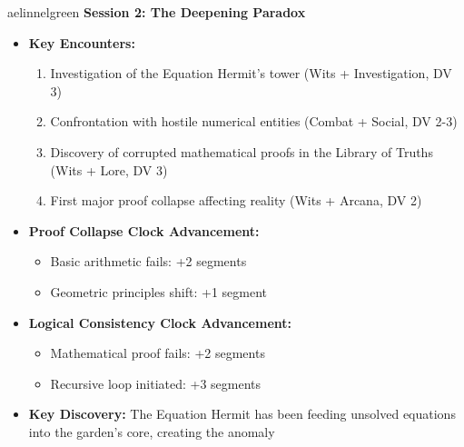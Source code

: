 \documentclass[11pt]{article}
\begin{document}
\begin{campaignsection}{aelinnelgreen}
\textbf{Session 2: The Deepening Paradox}
\begin{itemize}
    \item \textbf{Key Encounters:}
    \begin{enumerate}
        \item Investigation of the Equation Hermit's tower (Wits + Investigation, DV 3)
        \item Confrontation with hostile numerical entities (Combat + Social, DV 2-3)
        \item Discovery of corrupted mathematical proofs in the Library of Truths (Wits + Lore, DV 3)
        \item First major proof collapse affecting reality (Wits + Arcana, DV 2)
    \end{enumerate}
    \item \textbf{Proof Collapse Clock Advancement:}
    \begin{itemize}
        \item Basic arithmetic fails: +2 segments
        \item Geometric principles shift: +1 segment
    \end{itemize}
    \item \textbf{Logical Consistency Clock Advancement:}
    \begin{itemize}
        \item Mathematical proof fails: +2 segments
        \item Recursive loop initiated: +3 segments
    \end{itemize}
    \item \textbf{Key Discovery:} The Equation Hermit has been feeding unsolved equations into the garden's core, creating the anomaly
\end{itemize}


\end{campaignsection}
\end{document}
